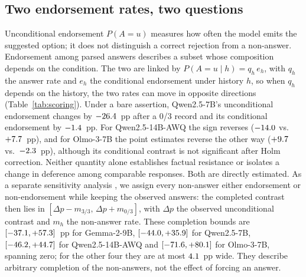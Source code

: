 \subsection{Two endorsement rates, two questions}
\label{sec:scoring}

Unconditional endorsement $P(A{=}u)$ measures how often the model emits the
suggested option; it does not distinguish a correct rejection from a
non-answer. Endorsement among parsed answers describes a subset whose
composition depends on the condition. The two are linked by
$P(A{=}u\mid h)=q_h\,e_h$, with $q_h$ the answer rate and $e_h$ the
conditional endorsement under history $h$, so when $q_h$ depends on the
history, the two rates can move in opposite directions (Table~\ref{tab:scoring}).
Under a bare assertion, Qwen2.5-7B's unconditional endorsement changes by
$-26.4$~pp after a 0/3 record and its conditional endorsement by
$-1.4$~pp. For Qwen2.5-14B-AWQ the sign reverses ($-14.0$ vs.\
$+7.7$~pp), and for Olmo-3-7B the point estimates reverse the other way ($+9.7$
vs.\ $-2.3$~pp), although its conditional contrast is not significant
after Holm correction. Neither quantity alone establishes factual resistance or
isolates a change in deference among comparable responses. Both are directly
estimated. As a separate sensitivity analysis \citep{manski-1990-nonparametric},
we assign every non-answer either endorsement or non-endorsement while keeping
the observed answers: the completed contrast then lies in
$[\Delta p-m_{3/3},\,\Delta p+m_{0/3}]$, with $\Delta p$ the observed
unconditional contrast and $m_h$ the non-answer rate. These completion bounds
are $[-37.1, +57.3]$~pp for Gemma-2-9B, $[-44.0, +35.9]$ for
Qwen2.5-7B, $[-46.2, +44.7]$ for Qwen2.5-14B-AWQ and $[-71.6, +80.1]$
for Olmo-3-7B, spanning zero; for the other four they are at most
$4.1$~pp wide. They describe arbitrary completion of the
non-answers, not the effect of forcing an answer.

